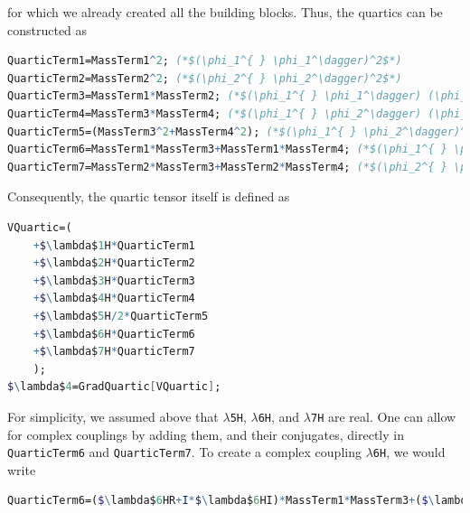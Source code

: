 \documentclass[11pt]{article}
\begin{document}
for which
we already created all the building blocks.
Thus, the quartics can be constructed as
\begin{lstlisting}[language=Mathematica,mathescape=true]
QuarticTerm1=MassTerm1^2; (*$(\phi_1^{ } \phi_1^\dagger)^2$*)
QuarticTerm2=MassTerm2^2; (*$(\phi_2^{ } \phi_2^\dagger)^2$*)
QuarticTerm3=MassTerm1*MassTerm2; (*$(\phi_1^{ } \phi_1^\dagger) (\phi_2^{ } \phi_2^\dagger)$*)
QuarticTerm4=MassTerm3*MassTerm4; (*$(\phi_1^{ } \phi_2^\dagger) (\phi_2^{ } \phi_1^\dagger)$*)
QuarticTerm5=(MassTerm3^2+MassTerm4^2); (*$(\phi_1^{ } \phi_2^\dagger)^2+ (\phi_2^{ } \phi_1^\dagger)^2$*)
QuarticTerm6=MassTerm1*MassTerm3+MassTerm1*MassTerm4; (*$(\phi_1^{ } \phi_1^\dagger)\bigl[ (\phi_1^{ } \phi_2^\dagger)+(\phi_2 \phi_1^\dagger)\bigr]$*)
QuarticTerm7=MassTerm2*MassTerm3+MassTerm2*MassTerm4; (*$(\phi_2^{ } \phi_2^\dagger)\bigl[ (\phi_1^{ } \phi_2^\dagger)+(\phi_2^{ } \phi_1^\dagger)\bigr]$*)
\end{lstlisting}
%
Consequently, the quartic tensor itself is defined as
\begin{lstlisting}[language=Mathematica,mathescape=true]
VQuartic=(
    +$\lambda$1H*QuarticTerm1
    +$\lambda$2H*QuarticTerm2
    +$\lambda$3H*QuarticTerm3
    +$\lambda$4H*QuarticTerm4
    +$\lambda$5H/2*QuarticTerm5
    +$\lambda$6H*QuarticTerm6
    +$\lambda$7H*QuarticTerm7
    );
$\lambda$4=GradQuartic[VQuartic];
\end{lstlisting}
For simplicity, we assumed above that
{\tt $\lambda$5H},
{\tt $\lambda$6H}, and
{\tt $\lambda$7H} are real.
One can allow for complex couplings by adding them, and their conjugates, directly in
{\tt QuarticTerm6} and
{\tt QuarticTerm7}. 
To create a complex coupling
{\tt $\lambda$6H},
we would write
\begin{lstlisting}[language=Mathematica,mathescape=true]
QuarticTerm6=($\lambda$6HR+I*$\lambda$6HI)*MassTerm1*MassTerm3+($\lambda$6HR-I*$\lambda$6HI)*MassTerm1*MassTerm4;
\end{lstlisting}
\end{document}
